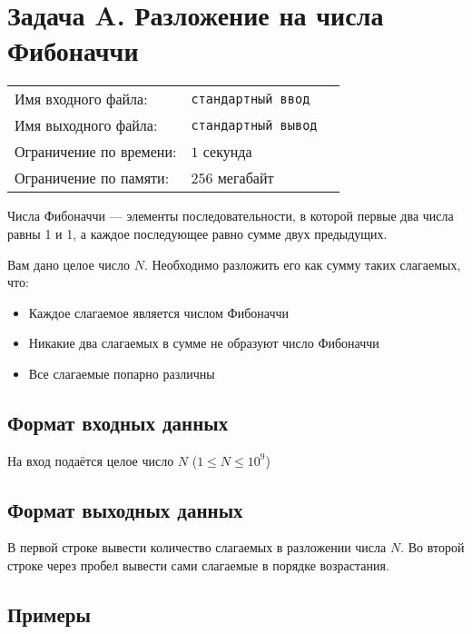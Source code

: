 \documentclass[12pt]{scrartcl}
\newcommand{\inputFile}{стандартный ввод}
\newcommand{\outputFile}{стандартный вывод}
\begin{document}
\singlespacing

\section*{Задача A. Разложение на числа Фибоначчи}

\begin{tabularx}{\textwidth}{l l X}
    Имя входного файла: & \texttt{\inputFile} \\
    Имя выходного файла: & \texttt{\outputFile} \\
    Ограничение по времени: & $1$ секунда \\
    Ограничение по памяти: & $256$ мегабайт \\
\end{tabularx}

Числа Фибоначчи --- элементы последовательности,
в которой первые два числа равны 1 и 1, а каждое последующее равно сумме двух предыдущих.

Вам дано целое число $N$.
Необходимо разложить его как сумму таких слагаемых, что:
\begin{itemize}
    \item Каждое слагаемое является числом Фибоначчи
    \item Никакие два слагаемых в сумме не образуют число Фибоначчи
    \item Все слагаемые попарно различны
\end{itemize}

\subsection*{Формат входных данных}
На вход подаётся целое число $N$ ($1 \le N \le 10^9$)

\subsection*{Формат выходных данных}
В первой строке вывести количество слагаемых в разложении числа $N$.
Во второй строке через пробел вывести сами слагаемые в порядке возрастания.

\subsection*{Примеры}
\end{document}
